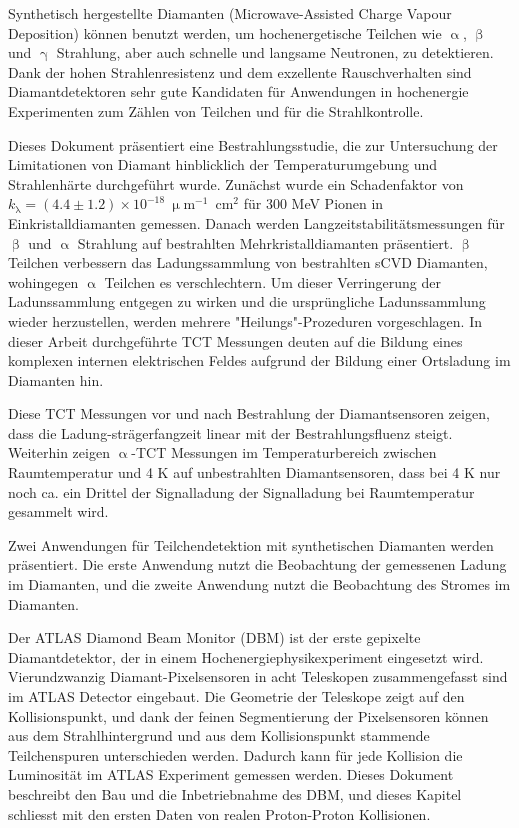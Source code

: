 \begin{abstractger}

Synthetisch hergestellte Diamanten (Microwave-Assisted Charge Vapour Deposition) k\"onnen benutzt werden, um hochenergetische Teilchen wie $\upalpha$, $\upbeta$ und $\upgamma$ Strahlung, aber auch schnelle und langsame Neutronen, zu detektieren. Dank der hohen Strahlenresistenz und dem exzellente Rauschverhalten sind Diamantdetektoren sehr gute Kandidaten f\"ur Anwendungen in hochenergie Experimenten zum Z\"ahlen von Teilchen und f\"ur die Strahlkontrolle.

Dieses Dokument pr\"asentiert eine Bestrahlungsstudie, die zur Untersuchung der Limitationen von Diamant hinblicklich der Temperaturumgebung und Strahlenh\"arte durchgef\"uhrt wurde. Zun\"achst wurde ein Schadenfaktor von $k_{\mathrm{\lambda}}=(4.4\pm1.2)\times10^{-18}~\upmu$m$^{-1}$~cm$^{2}$ f\"ur 300 MeV Pionen in Einkristalldiamanten gemessen. Danach werden Langzeitstabilit\"atsmessungen f\"ur $\upbeta$ und $\upalpha$ Strahlung auf bestrahlten Mehrkristalldiamanten pr\"asentiert. 
$\upbeta$ Teilchen verbessern das Ladungssammlung von bestrahlten sCVD Diamanten, wohingegen $\upalpha$ Teilchen es verschlechtern. Um dieser Verringerung der Ladunssammlung entgegen zu wirken und die urspr\"ungliche Ladunssammlung wieder herzustellen, werden mehrere "Heilungs"-Prozeduren vorgeschlagen. In dieser Arbeit durchgef\"uhrte TCT Messungen deuten auf die Bildung eines komplexen internen elektrischen Feldes aufgrund der Bildung einer Ortsladung im Diamanten hin.

Diese TCT Messungen vor und nach Bestrahlung der Diamantsensoren zeigen, dass die Ladung-str\"agerfangzeit linear mit der Bestrahlungsfluenz steigt. Weiterhin zeigen $\upalpha$-TCT Messungen im Temperaturbereich zwischen Raumtemperatur und 4 K auf unbestrahlten Diamantsensoren, dass bei 4 K nur noch ca. ein Drittel der Signalladung der Signalladung bei Raumtemperatur gesammelt wird. 

Zwei Anwendungen f\"ur Teilchendetektion mit synthetischen Diamanten werden pr\"asentiert. Die erste Anwendung nutzt die Beobachtung der gemessenen Ladung im Diamanten, und die zweite Anwendung nutzt die Beobachtung des Stromes im Diamanten.

Der ATLAS Diamond Beam Monitor (DBM) ist der erste gepixelte Diamantdetektor, der in einem Hochenergiephysikexperiment eingesetzt wird. Vierundzwanzig Diamant-Pixelsensoren in acht Teleskopen zusammengefasst sind im ATLAS Detector eingebaut. Die Geometrie der Teleskope zeigt auf den Kollisionspunkt, und dank der feinen Segmentierung der Pixelsensoren k\"onnen aus dem Strahlhintergrund und aus dem Kollisionspunkt stammende Teilchenspuren unterschieden werden. Dadurch kann f\"ur jede Kollision die Luminosit\"at im ATLAS Experiment gemessen werden. Dieses Dokument beschreibt den Bau und die Inbetriebnahme des DBM, und dieses Kapitel schliesst mit den ersten Daten von realen Proton-Proton Kollisionen.


\end{abstractger}
